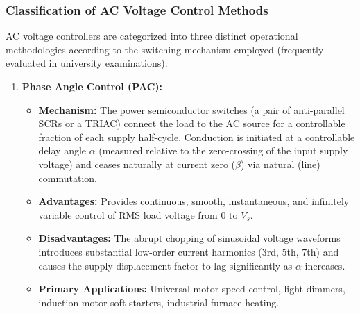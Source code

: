 \documentclass[11pt,a4paper]{article}
\begin{document}
\subsubsection{Classification of AC Voltage Control Methods}
AC voltage controllers are categorized into three distinct operational methodologies according to the switching mechanism employed (frequently evaluated in university examinations):

\begin{enumerate}[leftmargin=*]
  \item \textbf{Phase Angle Control (PAC):}
  \begin{itemize}[leftmargin=*]
    \item \textbf{Mechanism:} The power semiconductor switches (a pair of anti-parallel SCRs or a TRIAC) connect the load to the AC source for a controllable fraction of each supply half-cycle. Conduction is initiated at a controllable delay angle $\alpha$ (measured relative to the zero-crossing of the input supply voltage) and ceases naturally at current zero ($\beta$) via natural (line) commutation.
    \item \textbf{Advantages:} Provides continuous, smooth, instantaneous, and infinitely variable control of RMS load voltage from $0$ to $V_s$.
    \item \textbf{Disadvantages:} The abrupt chopping of sinusoidal voltage waveforms introduces substantial low-order current harmonics (3rd, 5th, 7th) and causes the supply displacement factor to lag significantly as $\alpha$ increases.
    \item \textbf{Primary Applications:} Universal motor speed control, light dimmers, induction motor soft-starters, industrial furnace heating.
  \end{itemize}


\end{enumerate}
\end{document}
